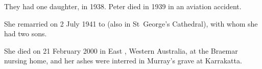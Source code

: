 They had one daughter, in 1938.\cite{JHBirthNotice}
Peter died in 1939 in an aviation accident.

She remarried on 2 July 1941\cite{MurrayMargMarriageNotice} to 
(also in St~George's Cathedral\cite{MurrayMargMarriageNotice}), with whom she had two sons.

She died on 21 February 2000 in East , Western Australia, at the Braemar nursing home,
and her ashes were interred in Murray's grave at Karrakatta.
